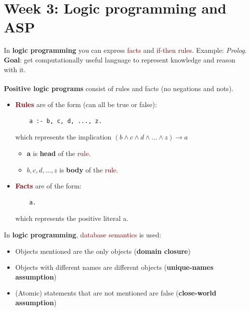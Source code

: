 \section{Week 3: Logic programming and ASP}

In \textbf{logic programming} you can express \textcolor{Maroon}{facts} and \textcolor{Maroon}{if-then rules}. Example: \textit{Prolog}. \textbf{Goal}: get computationally useful language to represent knowledge and reason with it. \\
\\
\textbf{Positive logic programs} consist of rules and facts (no negations and nots).
\begin{itemize}
    \setlength\itemsep{0em}
    \item \textbf{\textcolor{Maroon}{Rules}} are of the form (can all be true or false):
    \begin{lstlisting}
    a :- b, c, d, ..., z.
    \end{lstlisting}
    \hspace{0.75cm} which represents the implication \textcolor{NavyBlue}{$(b \wedge c \wedge d \wedge \ldots \wedge z) \rightarrow a$}
    \begin{itemize}
        \item \textbf{\textcolor{NavyBlue}{a}} is \textbf{\textcolor{NavyBlue}{head}} of the \textcolor{Maroon}{rule}.
        \item \textbf{\textcolor{NavyBlue}{$b, c, d, \ldots, z$}} is \textbf{\textcolor{NavyBlue}{body}} of the \textcolor{Maroon}{rule}.
    \end{itemize}
    \item \textbf{\textcolor{Maroon}{Facts}} are of the form:
    \begin{lstlisting}
    a.
    \end{lstlisting}
    \hspace{0.75cm} which represents the positive literal \textcolor{NavyBlue}{a}.
\end{itemize}

In \textbf{logic programming}, \textcolor{Maroon}{database semantics} is used:
\begin{itemize}
    \setlength\itemsep{0em}
    \item Objects mentioned are the only objects (\textbf{domain closure})
    \item Objects with different names are different objects (\textbf{unique-names assumption})
    \item (Atomic) statements that are not mentioned are false (\textbf{close-world assumption})
\end{itemize}

